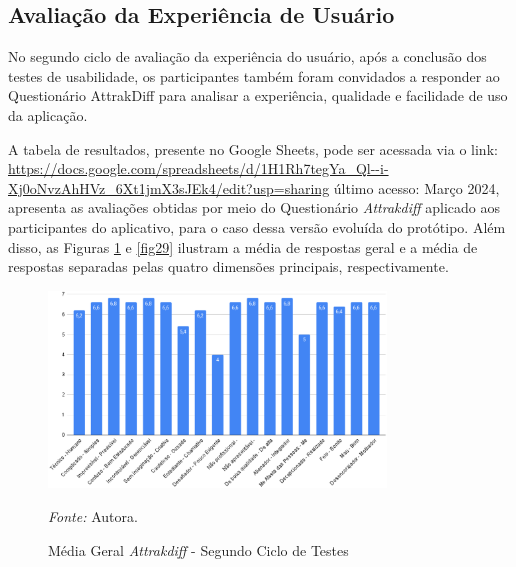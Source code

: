 \subsection{Avaliação da Experiência de Usuário}
\label{sec:Segunda Avaliação da Experiência de Usuário}
No segundo ciclo de avaliação da experiência do usuário, após a conclusão dos testes de usabilidade, os participantes também foram convidados a responder ao Questionário AttrakDiff para analisar a experiência, qualidade e facilidade de uso da aplicação.

A tabela de resultados, presente no Google Sheets, pode ser acessada via o link: 
\url{https://docs.google.com/spreadsheets/d/1H1Rh7tegYa_Ql--i-Xj0oNvzAhHVz_6Xt1jmX3sJEk4/edit?usp=sharing} último acesso: Março 2024, apresenta as avaliações obtidas por meio do Questionário \textit{Attrakdiff} aplicado aos participantes do aplicativo, para o caso 
dessa versão evoluída do protótipo. Além disso, as Figuras \ref{fig28} e \ref{fig29} ilustram a média de respostas geral e a média de respostas separadas pelas quatro dimensões principais, respectivamente.

\newpage

\begin{figure}[h!]
	\centering
	\caption{Média Geral \textit{Attrakdiff} - Segundo Ciclo de Testes}
	\begin{adjustbox}{center}
		\includegraphics[width=0.8\textwidth]{figuras/media-geral1.eps}
	\end{adjustbox}
	\begin{tablenotes}[flushleft]
		\centering
		\item \textit{Fonte:} Autora.
	\end{tablenotes}
	\label{fig28}
\end{figure}

